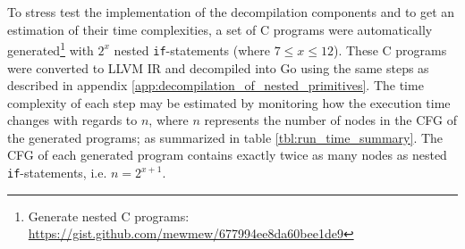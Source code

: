 To stress test the implementation of the decompilation components and to get an estimation of their time complexities, a set of C programs were automatically generated\footnote{Generate nested C programs: \url{https://gist.github.com/mewmew/677994ee8da60bee1de9}} with $ 2^{x} $ nested \texttt{if}-statements (where $ 7 \le x \le 12 $). These C programs were converted to LLVM IR and decompiled into Go using the same steps as described in appendix \ref{app:decompilation_of_nested_primitives}. The time complexity of each step may be estimated by monitoring how the execution time changes with regards to $ n $, where $ n $ represents the number of nodes in the CFG of the generated programs; as summarized in table \ref{tbl:run_time_summary}. The CFG of each generated program contains exactly twice as many nodes as nested \texttt{if}-statements, i.e. $ n = 2^{x+1} $.


